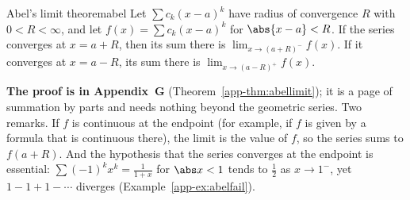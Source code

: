 \documentclass[11pt]{article}
\begin{document}
\begin{thm}{Abel's limit theorem}{abel}
Let $\sum c_k(x-a)^k$ have radius of convergence $R$ with $0<R<\infty$, and let $f(x)=\sum c_k(x-a)^k$ for $\abs{x-a}<R$. If the series converges at $x=a+R$, then its sum there is $\lim_{x\to(a+R)^-}f(x)$. If it converges at $x=a-R$, its sum there is $\lim_{x\to(a-R)^+}f(x)$.
\end{thm}
\textbf{The proof is in Appendix~G} (Theorem~\ref{app-thm:abellimit}); it is a page of summation by parts and needs nothing beyond the geometric series. Two remarks. If $f$ is continuous at the endpoint (for example, if $f$ is given by a formula that is continuous there), the limit is the value of $f$, so the series sums to $f(a+R)$. And the hypothesis that the series converges at the endpoint is essential: $\sum(-1)^kx^k=\frac1{1+x}$ for $\abs x<1$ tends to $\frac12$ as $x\to1^-$, yet $1-1+1-\cdots$ diverges (Example~\ref{app-ex:abelfail}).
\end{document}
